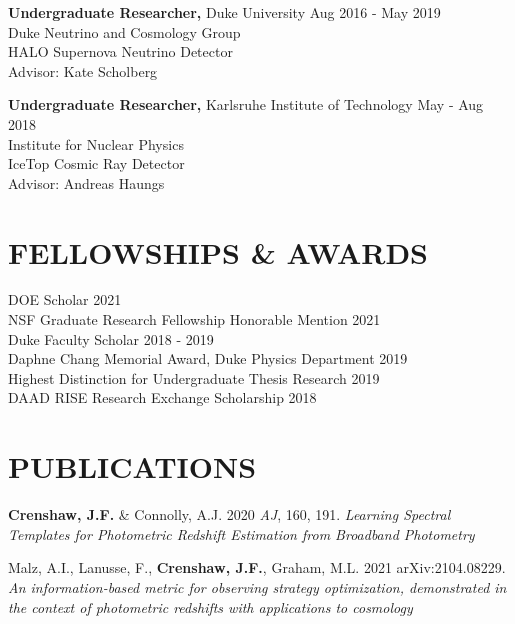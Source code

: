 \documentclass[margin]{res}
\begin{document}
\begin{resume}
\textbf{Undergraduate Researcher,} Duke University \hfill Aug 2016 - May 2019 \\
Duke Neutrino and Cosmology Group \\
HALO Supernova Neutrino Detector \\
Advisor: Kate Scholberg 

\textbf{Undergraduate Researcher,} Karlsruhe Institute of Technology \hfill May - Aug 2018 \\
Institute for Nuclear Physics \\
IceTop Cosmic Ray Detector \\
Advisor: Andreas Haungs

\section{\normalfont FELLOWSHIPS \& AWARDS}
\textbullet{} DOE Scholar \hfill 2021 \\
\textbullet{} NSF Graduate Research Fellowship Honorable Mention \hfill 2021 \\
\textbullet{} Duke Faculty Scholar \hfill 2018 - 2019 \\
\textbullet{} Daphne Chang Memorial Award, Duke Physics Department \hfill 2019 \\
\textbullet{} Highest Distinction for Undergraduate Thesis Research \hfill 2019 \\
\textbullet{} DAAD RISE Research Exchange Scholarship \hfill 2018 \\

\section{\normalfont PUBLICATIONS}

\hangindent=2mm
\textbf{Crenshaw, J.F.} \& Connolly, A.J. 2020 \textit{AJ}, 160, 191. \textit{Learning Spectral Templates for Photometric Redshift Estimation from Broadband Photometry}

\vspace{-3.5mm} \hangindent=2mm
Malz, A.I., Lanusse, F., \textbf{Crenshaw, J.F.}, Graham, M.L. 2021 arXiv:2104.08229. \textit{An information-based metric for observing strategy optimization, demonstrated in the context of photometric redshifts with applications to cosmology}


\end{resume}
\end{document}
